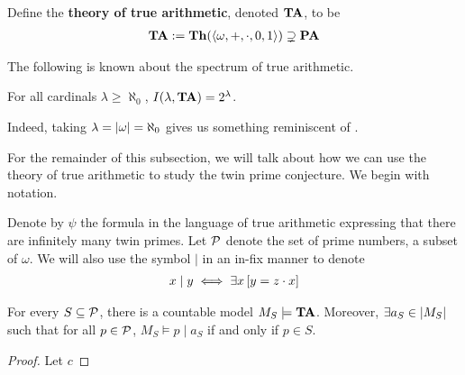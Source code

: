 \begin{boxdefinition}\label{Ch1:Def:True_Arith}
    Define the \textbf{theory of true arithmetic}, denoted $\mathbf{TA}$, to be
    \begin{align*}
        \mathbf{TA} := \mathbf{Th}\!\left( \left\langle \omega, +, \cdot, 0, 1 \right\rangle \right) \supsetneq \mathbf{PA}
    \end{align*}
\end{boxdefinition}

The following is known about the spectrum of true arithmetic.

\begin{boxtheorem}\label{Ch1:Thm:Spectrum_of_TA}
    For all cardinals $\lambda \geq \aleph_0$, $I\!\left( \lambda, \mathbf{TA} \right) = 2^{\lambda}$.
\end{boxtheorem}

Indeed, taking $\lambda = \left\lvert \omega \right\rvert = \aleph_0$ gives us something reminiscent of .

For the remainder of this subsection, we will talk about how we can use the theory of true arithmetic to study the twin prime conjecture. We begin with notation.

\begin{boxlnotation}
    Denote by $\psi$ the formula in the language of true arithmetic expressing that there are infinitely many twin primes. Let $\mathcal{P}$ denote the set of prime numbers, a subset of $\omega$. We will also use the symbol $\mid$ in an in-fix manner to denote
    \begin{align*}
        x \mid y \iff \exists x \left[ y = z \cdot x \right]
    \end{align*}
\end{boxlnotation}

\begin{boxlemma}
    For every $S \subseteq \mathcal{P}$, there is a countable model $M_S \models \mathbf{TA}$. Moreover, $\exists a_S \in \left\lvert M_S \right\rvert$ such that for all $p \in \mathcal{P}$, $M_S \models p \mid a_S$ if and only if $p \in S$.
\end{boxlemma}
\begin{proof}
    Let $c$
\end{proof}